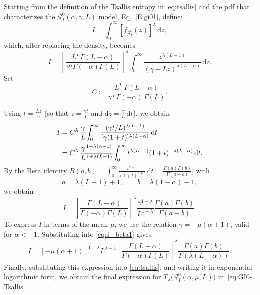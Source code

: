 \documentclass[
  lettersize  journal,
]{IEEEtran}%
\begin{document}

Starting from the definition of the Tsallis entropy in
\eqref{eq:tsallis} and the pdf that characterizes the
\(\mathcal{G}^0_I(\alpha,\gamma,L)\) model, Eq.~\eqref{E:gi01}, define:
\begin{equation*}
I = \int_0^\infty \left[ f_{\mathcal{G}_I^0}(z) \right]^\lambda \,\mathrm{d}z,
\end{equation*} which, after replacing the density, becomes
\begin{equation*}
I = \left[ \frac{L^L \Gamma(L - \alpha)}{\gamma^\alpha \Gamma(-\alpha) \Gamma(L)} \right]^\lambda 
\int_0^\infty \frac{z^{\lambda(L-1)}}{(\gamma + Lz)^{\lambda(L - \alpha)}}\,\mathrm{d}z.
\label{eq:J_initial}
\end{equation*} Set \[
C \coloneqq \frac{L^L\,\Gamma(L-\alpha)}{\gamma^\alpha\,\Gamma(-\alpha)\,\Gamma(L)}.
\]

Using \(t = \frac{Lz}{\gamma}\) (so that \(z = \frac{\gamma t}{L}\) and
\(\mathrm{d}z = \frac{\gamma}{L}\,\mathrm{d}t\)), we obtain
\begin{align*}
I &= C^\lambda\,\frac{\gamma}{L}\!
\int_0^\infty \frac{(\gamma t/L)^{\lambda(L-1)}}{[\gamma(1+t)]^{\lambda(L-\alpha)}}\,\mathrm{d}t \notag\\
&= C^\lambda\,\frac{\gamma^{\,1+\lambda(\alpha-1)}}{L^{\,1+\lambda(L-1)}}\!
\int_0^\infty t^{\lambda(L-1)}(1+t)^{-\lambda(L-\alpha)}\,\mathrm{d}t.
\end{align*} By the Beta identity
\(B(a,b)=\int_0^\infty \tfrac{t^{a-1}}{(1+t)^{a+b}}\,\mathrm{d}t=\frac{\Gamma(a)\Gamma(b)}{\Gamma(a+b)}\),
with \[
a=\lambda(L-1)+1,\qquad b=\lambda(1-\alpha)-1,
\] we obtain \begin{equation}
I = \left[ \frac{\Gamma(L - \alpha)}{\Gamma(-\alpha) \Gamma(L)} \right]^\lambda 
\frac{\gamma^{1-\lambda}}{L^{1-\lambda}} 
\frac{\Gamma(a)\Gamma(b)}{\Gamma(a+b)}.
\label{eq:J_beta1}
\end{equation} To express \(I\) in terms of the mean \(\mu\), we use the
relation \(\gamma = -\mu(\alpha + 1)\), valid for \(\alpha < -1\).
Substituting into \eqref{eq:J_beta1} gives \begin{equation*}
I = [-\mu(\alpha + 1)]^{1-\lambda} L^{\lambda-1} 
\left[ \frac{\Gamma(L - \alpha)}{\Gamma(-\alpha) \Gamma(L)} \right]^\lambda 
\frac{\Gamma(a)\Gamma(b)}{\Gamma(\lambda(L - \alpha))}.
\end{equation*} Finally, substituting this expression into
\eqref{eq:tsallis}, and writing it in exponential--logarithmic form, we
obtain the final expression for
\(T_\lambda\bigl(\mathcal{G}^0_I(\alpha, \mu, L)\bigr)\)
in~\eqref{eq:GI0-Tsallis}.
\end{document}
